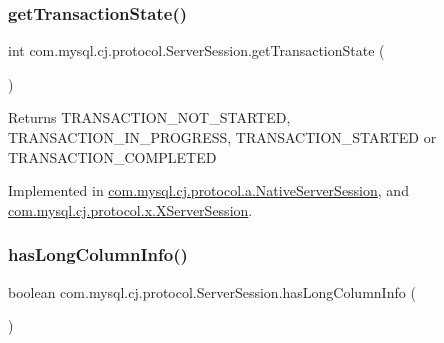\mbox{\label{interfacecom_1_1mysql_1_1cj_1_1protocol_1_1_server_session_a0af5a6df719817773de40fbc1aba021d}} 
\subsubsection{\texorpdfstring{get\+Transaction\+State()}{getTransactionState()}}
{\footnotesize\ttfamily int com.\+mysql.\+cj.\+protocol.\+Server\+Session.\+get\+Transaction\+State (\begin{DoxyParamCaption}{ }\end{DoxyParamCaption})}

\begin{DoxyReturn}{Returns}
T\+R\+A\+N\+S\+A\+C\+T\+I\+O\+N\+\_\+\+N\+O\+T\+\_\+\+S\+T\+A\+R\+T\+ED, T\+R\+A\+N\+S\+A\+C\+T\+I\+O\+N\+\_\+\+I\+N\+\_\+\+P\+R\+O\+G\+R\+E\+SS, T\+R\+A\+N\+S\+A\+C\+T\+I\+O\+N\+\_\+\+S\+T\+A\+R\+T\+ED or T\+R\+A\+N\+S\+A\+C\+T\+I\+O\+N\+\_\+\+C\+O\+M\+P\+L\+E\+T\+ED 
\end{DoxyReturn}


Implemented in \mbox{\hyperlink{classcom_1_1mysql_1_1cj_1_1protocol_1_1a_1_1_native_server_session_af4dfde9ca1e0cea7177b791ba4819f06}{com.\+mysql.\+cj.\+protocol.\+a.\+Native\+Server\+Session}}, and \mbox{\hyperlink{classcom_1_1mysql_1_1cj_1_1protocol_1_1x_1_1_x_server_session_ab49919f80a96ee3bd61cd00d94018dda}{com.\+mysql.\+cj.\+protocol.\+x.\+X\+Server\+Session}}.

\mbox{\label{interfacecom_1_1mysql_1_1cj_1_1protocol_1_1_server_session_a7b542c64c25cf2ebbc4c5709dd6bad80}} 
\subsubsection{\texorpdfstring{has\+Long\+Column\+Info()}{hasLongColumnInfo()}}
{\footnotesize\ttfamily boolean com.\+mysql.\+cj.\+protocol.\+Server\+Session.\+has\+Long\+Column\+Info (\begin{DoxyParamCaption}{ }\end{DoxyParamCaption})}




